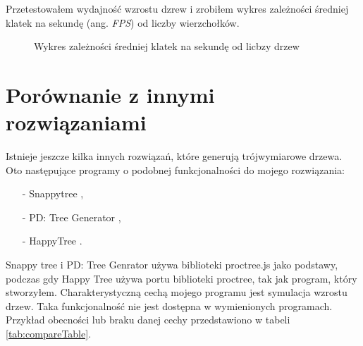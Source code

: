 \documentclass[a4paper,twoside,12pt]{report}
\begin{document}
Przetestowałem wydajność wzrostu dzrew i zrobiłem wykres 
zależności średniej klatek na sekundę (ang. \textit{FPS}) 
od liczby wierzchołków.

\begin{figure}[H]
	\begin{center}
	\end{center}
	\caption{Wykres zależności średniej klatek na sekundę od licbzy drzew}
	\label{fig:chart}
\end{figure}

\section{Porównanie z innymi rozwiązaniami}

Istnieje jeszcze kilka innych rozwiązań, które generują 
trójwymiarowe drzewa. Oto następujące programy o podobnej 
funkcjonalności do mojego rozwiązania:
\begin{itemize}
	\item[-] Snappytree \cite{snappyTree},
	\item[-] PD: Tree Generator \cite{PDTree},
	\item[-] HappyTree \cite{proctree}. 
\end{itemize}
Snappy tree i PD: Tree Genrator używa biblioteki proctree.js 
jako podstawy, podczas gdy Happy Tree używa portu biblioteki proctree, 
tak jak program, który stworzyłem.
Charakterystyczną cechą mojego programu jest symulacja wzrostu drzew. 
Taka funkcjonalność nie jest dostępna w wymienionych programach.
Przykład obecności lub braku danej cechy przedstawiono w tabeli \ref{tab:compareTable}.
\end{document}
